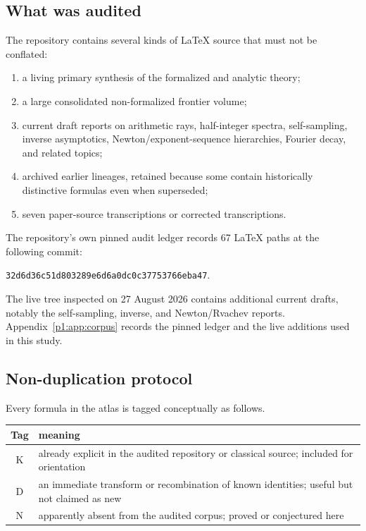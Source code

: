 \documentclass[11pt]{article}
\theoremstyle{definition}
\theoremstyle{remark}
\newcommand{\statusknown}{\textsf{K}}
\newcommand{\statusderived}{\textsf{D}}
\newcommand{\statusnew}{\textsf{N}}
\begin{document}
\subsection{What was audited}

The repository contains several kinds of LaTeX source that must not be conflated:

\begin{enumerate}
\item a living primary synthesis of the formalized and analytic theory;
\item a large consolidated non-formalized frontier volume;
\item current draft reports on arithmetic rays, half-integer spectra, self-sampling,
      inverse asymptotics, Newton/exponent-sequence hierarchies, Fourier decay, and related
      topics;
\item archived earlier lineages, retained because some contain historically distinctive
      formulas even when superseded;
\item seven paper-source transcriptions or corrected transcriptions.
\end{enumerate}

The repository's own pinned audit ledger records 67 LaTeX paths at the following commit:
\begin{center}
\small\texttt{32d6d36c51d803289e6d6a0dc0c37753766eba47}.
\end{center}
The live tree inspected on 27 August 2026 contains additional current drafts, notably the
self-sampling, inverse, and Newton/Rvachev reports.  Appendix~\ref{p1:app:corpus} records the pinned ledger and the live
additions used in this study.

\subsection{Non-duplication protocol}

Every formula in the atlas is tagged conceptually as follows.

\begin{center}
\begin{tabular}{@{}c p{}@{}}
\toprule
Tag & meaning \\
\midrule
\statusknown & already explicit in the audited repository or classical source; included for orientation \\
\statusderived & an immediate transform or recombination of known identities; useful but not claimed as new \\
\statusnew & apparently absent from the audited corpus; proved or conjectured here \\
\bottomrule
\end{tabular}
\end{center}
\end{document}
